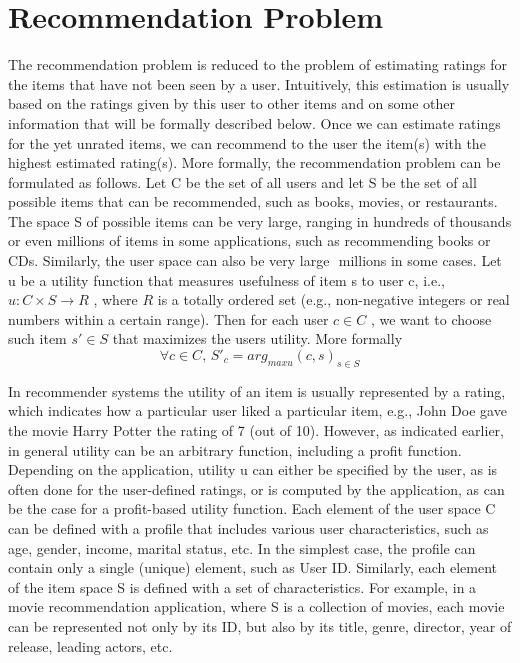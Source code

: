 \section{Recommendation Problem}
The recommendation problem is reduced to the problem of estimating ratings for the items that have not been seen by a user. Intuitively, this estimation is usually based on the ratings given by this user to other items and on some other information that will be formally described below. Once we can estimate ratings for the yet unrated items, we can recommend to the user the item(s) with the highest estimated rating(s).
More formally, the recommendation problem can be formulated as follows. Let C be the set of all users and let S be the set of all possible items that can be recommended, such as books, movies, or restaurants. The space S of possible items can be very large, ranging in hundreds of thousands or even millions of items in some applications, such as recommending books or CDs.
Similarly, the user space can also be very large  millions in some cases. Let u be a utility function that measures usefulness of item s to user c, i.e., $u :C \times S \rightarrow R$ , where $R$ is a totally ordered set (e.g., non-negative integers or real numbers within a certain range). Then for each user $c\in C$ , we want to choose such item $s' \in S$ that maximizes the users utility. More formally
\begin{equation} \label{eq:1}
\forall c \in C,\, S'_c = arg_{max u} (c,s)_{s \in S}
\end{equation}

In recommender systems the utility of an item is usually represented by a rating, which indicates how a particular user liked a particular item, e.g., John Doe gave the movie Harry Potter the rating of 7 (out of 10). However, as indicated earlier, in general utility can be an arbitrary function, including a profit function. Depending on the application, utility u can either be specified by the user, as is often done for the user-defined ratings, or is computed by the application, as can be the case for a profit-based utility function.
Each element of the user space C can be defined with a profile that includes various user characteristics, such as age, gender, income, marital status, etc. In the simplest case, the profile can contain only a single (unique) element, such as User ID. Similarly, each element of the item space S is defined with a set of characteristics. For example, in a movie  recommendation application, where S is a collection of movies, each movie can be represented not only by its ID, but also by its title, genre, director, year of release, leading actors, etc.


